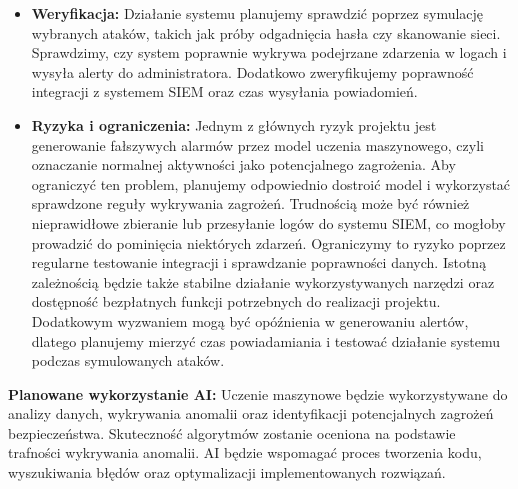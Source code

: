 \documentclass[11pt,a4paper,oneside]{article}
\newif\ifpodpowiedzi
\newcommand{\podpowiedz}[1]{\ifpodpowiedzi\par\begingroup\small\color{hintcolor}\textit{Wskazówka: #1}\par\endgroup\fi}
\begin{document}
\begin{itemize}
{Dodatkowo skorzystamy z ogólnodostępnych reguł wykrywania zagrożeń, np. w formacie Sigma, które pomagają rozpoznawać podejrzane zdarzenia na podstawie określonych wzorców. Reguły te będziemy pobierać z publicznych repozytoriów GitHub i wykorzystywać zgodnie z~warunkami licencji Open Source.}
\item \textbf{Weryfikacja:} {Działanie systemu planujemy sprawdzić poprzez symulację wybranych ataków, takich jak próby odgadnięcia hasła czy skanowanie sieci. Sprawdzimy, czy system poprawnie wykrywa podejrzane zdarzenia w logach i wysyła alerty do administratora. Dodatkowo zweryfikujemy poprawność integracji z systemem SIEM oraz czas wysyłania powiadomień.}
\item \textbf{Ryzyka i ograniczenia:} {Jednym z głównych ryzyk projektu jest generowanie fałszywych alarmów przez model uczenia maszynowego, czyli oznaczanie normalnej aktywności jako potencjalnego zagrożenia. Aby ograniczyć ten problem, planujemy odpowiednio dostroić model i wykorzystać sprawdzone reguły wykrywania zagrożeń. Trudnością może być również nieprawidłowe zbieranie lub przesyłanie logów do systemu SIEM, co mogłoby prowadzić do pominięcia niektórych zdarzeń. Ograniczymy to ryzyko poprzez regularne testowanie integracji i sprawdzanie poprawności danych. Istotną zależnością będzie także stabilne działanie wykorzystywanych narzędzi oraz dostępność bezpłatnych funkcji potrzebnych do realizacji projektu. Dodatkowym wyzwaniem mogą być opóźnienia w generowaniu alertów, dlatego planujemy mierzyć czas powiadamiania i testować działanie systemu podczas symulowanych ataków.}
\end{itemize}

\podpowiedz{Jeżeli przewidujecie wykorzystanie AI, określcie, czy ma wspomagać prace, stanowić część rozwiązania, czy pełnić obie role. Jeśli AI jest elementem wymagań projektu, wskażcie sposób oceny jej działania. Gdy nie planujecie AI, wpiszcie tę informację.}
\textbf{Planowane wykorzystanie AI:} {Uczenie maszynowe będzie wykorzystywane do analizy danych, wykrywania anomalii oraz identyfikacji potencjalnych zagrożeń bezpieczeństwa. Skuteczność algorytmów zostanie oceniona na podstawie trafności wykrywania anomalii. AI będzie wspomagać proces tworzenia kodu, wyszukiwania błędów oraz optymalizacji implementowanych rozwiązań.}
\end{document}
